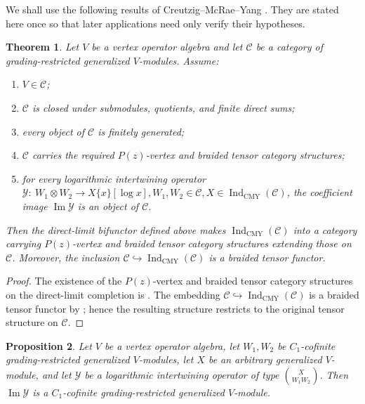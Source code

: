 \documentclass[12pt,leqno]{amsart}
\numberwithin{equation}{section} \newtheorem{thm}{Theorem}[section] \newtheorem{lem}[thm]{Lemma} \newtheorem{ex}[thm]{Example} \newtheorem{prop}[thm]{Proposition} \newtheorem{cor}[thm]{Corollary} \newtheorem{defi}[thm]{Definition} \newtheorem{rmk}[thm]{Remark} \newtheorem{notation}[thm]{Notation}
\newcommand{\IndCMY}{\operatorname{Ind}_{\mathrm{CMY}}}
\begin{document}
We shall use the following results of Creutzig--McRae--Yang \cite{CMY}. They are stated here once so that later applications need only verify their hypotheses.

\begin{thm}
\label{thm:CMY-direct-limit}
Let $V$ be a vertex operator algebra and let $\mathcal C$ be a category of grading-restricted generalized $V$-modules. Assume:
\begin{enumerate}[label=\textnormal{(\arabic*)}]
\item $V\in\mathcal C$;
\item $\mathcal C$ is closed under submodules, quotients, and finite
direct sums;
\item every object of $\mathcal C$ is finitely generated;
\item $\mathcal C$ carries the required $P(z)$-vertex and braided
tensor category structures;
\item for every logarithmic intertwining operator
\(\mathcal Y:\ W_1\otimes W_2\longrightarrow X\{x\}[\log x], W_1,W_2\in\mathcal C,X\in\IndCMY(\mathcal C)\), the coefficient image $\operatorname{Im}\mathcal Y$ is an object of $\mathcal C$.
\end{enumerate}
Then the direct-limit bifunctor defined above makes $\IndCMY(\mathcal C)$ into a category carrying $P(z)$-vertex and braided tensor category structures extending those on $\mathcal C$. Moreover, the inclusion \(\mathcal C\hookrightarrow\IndCMY(\mathcal C)\) is a braided tensor functor.
\end{thm}

\begin{proof}
The existence of the $P(z)$-vertex and braided tensor category structures on the direct-limit completion is \cite[Theorem~1.1]{CMY}. The embedding $\mathcal C\hookrightarrow\IndCMY(\mathcal C)$ is a braided tensor functor by \cite[Theorem~5.4]{CMY}; hence the resulting structure restricts to the original tensor structure on $\mathcal C$.
\end{proof}

\begin{prop}
\label{prop:CMY-coefficient-image}
Let $V$ be a vertex operator algebra, let $W_1,W_2$ be $C_1$-cofinite grading-restricted generalized $V$-modules, let $X$ be an arbitrary generalized $V$-module, and let $\mathcal Y$ be a logarithmic intertwining operator of type \(\binom{X}{W_1 W_2}.\) Then \(\operatorname{Im}\mathcal Y\) is a $C_1$-cofinite grading-restricted generalized $V$-module.
\end{prop}
\end{document}
